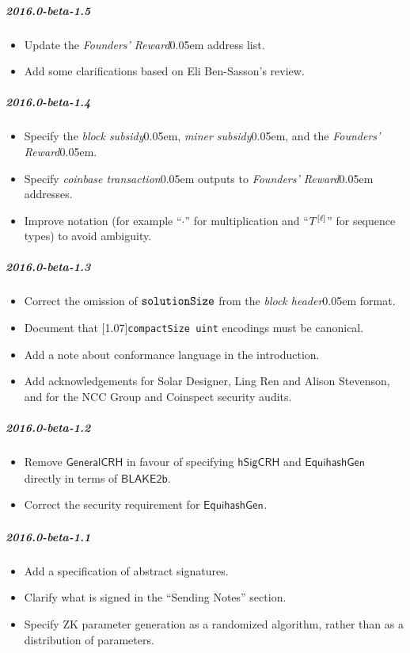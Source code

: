 \documentclass{article}
\let\oldtexttt\texttt
\let\oldmathtt\mathtt
\renewcommand{\texttt}[1]{\scalebox{1.02}[1.07]{\oldtexttt{#1}}}
\renewcommand{\mathtt}[1]{\scalebox{1.02}[1.07]{$\oldmathtt{#1}$}}
\newcommand{\term}[1]{\textsl{#1}\kern 0.05em\xspace}
\newcommand{\blockHeader}{\term{block header}}
\newcommand{\coinbaseTransaction}{\term{coinbase transaction}}
\newcommand{\typeexp}[2]{{#1}\vphantom{)}^{[{#2}]}}
\newcommand{\hSigCRH}{\mathsf{hSigCRH}}
\newcommand{\EquihashGen}[1]{\mathsf{EquihashGen}_{#1}}
\newcommand{\BlakeGeneric}{\mathsf{BLAKE2b}}
\newcommand{\mult}{\cdot}
\newcommand{\blockSubsidy}{\term{block subsidy}}
\newcommand{\minerSubsidy}{\term{miner subsidy}}
\newcommand{\foundersReward}{\term{Founders' Reward}}
\newcommand{\type}[1]{\texttt{#1}}
\newcommand{\compactSize}{\type{compactSize uint}}
\newcommand{\solutionSize}{\mathtt{solutionSize}}
\begin{document}
\subparagraph{2016.0-beta-1.5}

\begin{itemize}
    \item Update the \foundersReward address list.
    \item Add some clarifications based on Eli Ben-Sasson's review.
\end{itemize}

\subparagraph{2016.0-beta-1.4}

\begin{itemize}
    \item Specify the \blockSubsidy, \minerSubsidy, and the \foundersReward.
    \item Specify \coinbaseTransaction outputs to \foundersReward addresses.
    \item Improve notation (for example ``$\mult$'' for multiplication and
          ``$\typeexp{T}{\ell}$'' for sequence types) to avoid ambiguity.
\end{itemize}

\subparagraph{2016.0-beta-1.3}

\begin{itemize}
    \item Correct the omission of $\solutionSize$ from the \blockHeader format.
    \item Document that \compactSize{} encodings must be canonical.
    \item Add a note about conformance language in the introduction.
    \item Add acknowledgements for Solar Designer, Ling Ren and Alison Stevenson,
          and for the NCC Group and Coinspect security audits.
\end{itemize}

\subparagraph{2016.0-beta-1.2}

\begin{itemize}
    \item Remove $\mathsf{GeneralCRH}$ in favour of specifying $\hSigCRH$ and
          $\EquihashGen{}$ directly in terms of $\BlakeGeneric$.
    \item Correct the security requirement for $\EquihashGen{}$.
\end{itemize}

\subparagraph{2016.0-beta-1.1}

\begin{itemize}
    \item Add a specification of abstract signatures.
    \item Clarify what is signed in the ``Sending Notes'' section.
    \item Specify ZK parameter generation as a randomized algorithm, rather
          than as a distribution of parameters.
\end{itemize}
\end{document}
